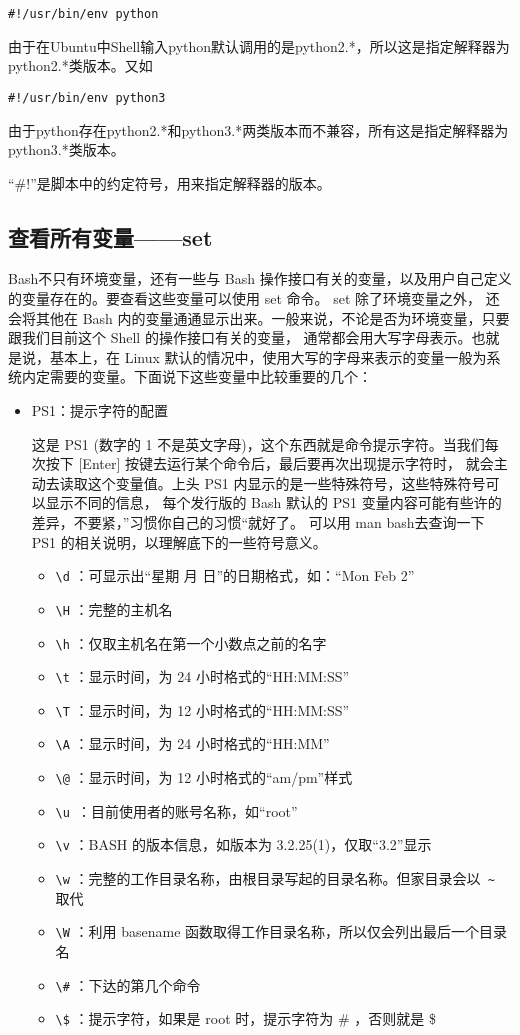 {\verb|#!/usr/bin/env python|

由于在Ubuntu中Shell输入python默认调用的是python2.*，所以这是指定解释器为python2.*类版本。又如

\verb|#!/usr/bin/env python3|

由于python存在python2.*和python3.*两类版本而不兼容，所有这是指定解释器为python3.*类版本。

``\#!''是脚本中的约定符号，用来指定解释器的版本。



\subsection{查看所有变量——set}
Bash不只有环境变量，还有一些与 Bash 操作接口有关的变量，以及用户自己定义的变量存在的。要查看这些变量可以使用 set 命令。 set 除了环境变量之外， 还会将其他在 Bash 内的变量通通显示出来。一般来说，不论是否为环境变量，只要跟我们目前这个 Shell 的操作接口有关的变量， 通常都会用大写字母表示。也就是说，基本上，在 Linux 默认的情况中，使用大写的字母来表示的变量一般为系统内定需要的变量。下面说下这些变量中比较重要的几个：
\begin{itemize}
\item PS1：提示字符的配置

\qquad 这是 PS1 (数字的 1 不是英文字母)，这个东西就是命令提示字符。当我们每次按下 [Enter] 按键去运行某个命令后，最后要再次出现提示字符时， 就会主动去读取这个变量值。上头 PS1 内显示的是一些特殊符号，这些特殊符号可以显示不同的信息， 每个发行版的 Bash 默认的 PS1 变量内容可能有些许的差异，不要紧，”习惯你自己的习惯“就好了。 可以用 man bash去查询一下 PS1 的相关说明，以理解底下的一些符号意义。
\begin{itemize}
\item \verb|\d| ：可显示出“星期 月 日”的日期格式，如：“Mon Feb 2”
\item \verb|\H| ：完整的主机名
\item \verb|\h| ：仅取主机名在第一个小数点之前的名字
\item \verb|\t| ：显示时间，为 24 小时格式的“HH:MM:SS”
\item \verb|\T| ：显示时间，为 12 小时格式的“HH:MM:SS”
\item \verb|\A| ：显示时间，为 24 小时格式的“HH:MM”
\item \verb|\@| ：显示时间，为 12 小时格式的“am/pm”样式
\item \verb|\u |：目前使用者的账号名称，如“root”
\item \verb|\v| ：BASH 的版本信息，如版本为 3.2.25(1)，仅取“3.2”显示
\item \verb|\w| ：完整的工作目录名称，由根目录写起的目录名称。但家目录会以\verb| ~| 取代
\item \verb|\W| ：利用 basename 函数取得工作目录名称，所以仅会列出最后一个目录名
\item \verb|\#| ：下达的第几个命令
\item \verb|\$| ：提示字符，如果是 root 时，提示字符为 \# ，否则就是 \$ 
\end{itemize}


\end{itemize}}
